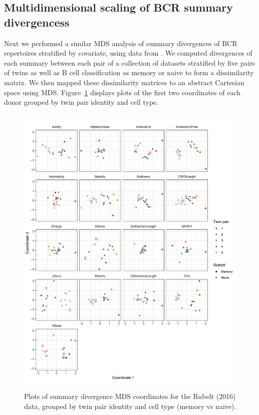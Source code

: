\documentclass{article}
\begin{document}
\subsection*{Multidimensional scaling of BCR summary divergencess}
Next we performed a similar MDS analysis of summary divergences of BCR repertoires stratified by covariate, using data from \cite{Rubelt2016-tl}.
We computed divergences of each summary between each pair of a collection of datasets stratified by five pairs of twins as well as B cell classification as memory or naive to form a dissimilarity matrix.
We then mapped these dissimilarity matrices to an abstract Cartesian space using MDS.
Figure~\ref{fig:BCR_MDS} displays plots of the first two coordinates of each donor grouped by twin pair identity and cell type.
\begin{figure}
    \includegraphics[width=\linewidth]{Figures/bcr_pca.pdf}
    \caption{Plots of summary divergence MDS coordinates for the Rubelt (2016) data, grouped by twin pair identity and cell type (memory vs naive).}
    \label{fig:BCR_MDS}
\end{figure}
\end{document}
